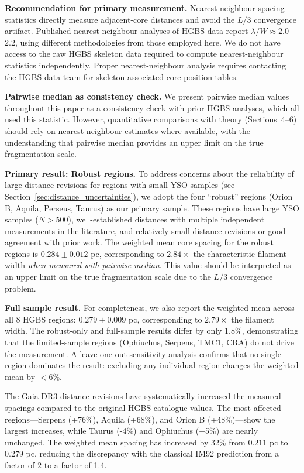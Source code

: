 \documentclass[twocolumn,longtitle,usenatbib]{mnras}
\begin{document}
\textbf{Recommendation for primary measurement.}
Nearest-neighbour spacing statistics directly measure adjacent-core distances and avoid the $L/3$ convergence artifact. Published nearest-neighbour analyses of HGBS data report $\lambda/W \approx 2.0$--$2.2$, using different methodologies from those employed here. We do not have access to the raw HGBS skeleton data required to compute nearest-neighbour statistics independently. Proper nearest-neighbour analysis requires contacting the HGBS data team for skeleton-associated core position tables.

\textbf{Pairwise median as consistency check.}
We present pairwise median values throughout this paper as a consistency check with prior HGBS analyses, which all used this statistic. However, quantitative comparisons with theory (Sections~4--6) should rely on nearest-neighbour estimates where available, with the understanding that pairwise median provides an upper limit on the true fragmentation scale.

\textbf{Primary result: Robust regions.}
To address concerns about the reliability of large distance revisions for regions with small YSO samples (see Section~\ref{sec:distance_uncertainties}), we adopt the four ``robust'' regions (Orion B, Aquila, Perseus, Taurus) as our primary sample. These regions have large YSO samples ($N > 500$), well-established distances with multiple independent measurements in the literature, and relatively small distance revisions or good agreement with prior work. The weighted mean core spacing for the robust regions is $0.284 \pm 0.012$ pc, corresponding to $2.84\times$ the characteristic filament width \textit{when measured with pairwise median}. This value should be interpreted as an upper limit on the true fragmentation scale due to the $L/3$ convergence problem.

\textbf{Full sample result.} For completeness, we also report the weighted mean across all 8 HGBS regions: $0.279 \pm 0.009$ pc, corresponding to $2.79\times$ the filament width. The robust-only and full-sample results differ by only 1.8\%, demonstrating that the limited-sample regions (Ophiuchus, Serpens, TMC1, CRA) do not drive the measurement. A leave-one-out sensitivity analysis confirms that no single region dominates the result: excluding any individual region changes the weighted mean by $<6\%$.

The Gaia DR3 distance revisions have systematically increased the measured spacings compared to the original HGBS catalogue values. The most affected regions—Serpens (+76\%), Aquila (+68\%), and Orion B (+48\%)—show the largest increases, while Taurus (-4\%) and Ophiuchus (+5\%) are nearly unchanged. The weighted mean spacing has increased by 32\% from $0.211$ pc to $0.279$ pc, reducing the discrepancy with the classical IM92 prediction from a factor of 2 to a factor of 1.4.
\end{document}
